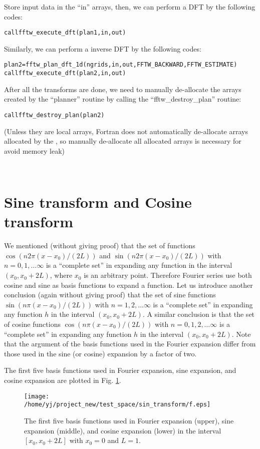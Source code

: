\documentclass{article}
\newcommand{\codestar}[1]{\text{{\bfseries{#1}}}}
\newenvironment{tmcode}[1][]{\begin{alltt} }{\end{alltt}}
\begin{document}
Store input data in the ``in'' arrays, then, we can perform a DFT by the
following codes:
\begin{tmcode}
call fftw_execute_dft(plan1, in, out)
\end{tmcode}
Similarly, we can perform a inverse DFT by the following codes:
\begin{tmcode}
plan2 = fftw_plan_dft_1d(ngrids, in,out,FFTW_BACKWARD,FFTW_ESTIMATE)
call fftw_execute_dft(plan2, in, out)
\end{tmcode}
After all the transforms are done, we need to manually de-allocate the arrays
created by the ``planner'' routine by calling the ``fftw\_destroy\_plan''
routine:
\begin{tmcode}
call fftw_destroy_plan(plan2)
\end{tmcode}
(Unless they are local arrays, Fortran does not automatically de-allocate
arrays allocated by the {\codestar{acllocate()}}, so manually de-allocate all
allocated arrays is necessary for avoid memory leak)

\

\section{Sine transform and Cosine transform}

We mentioned (without giving proof) that the set of functions $\cos (n 2 \pi
(x - x_0) / (2 L))$ and $\sin (n 2 \pi (x - x_0) / (2 L))$ with $n = 0, 1,
\ldots \infty$ is a ``complete set'' in expanding any function in the interval
$(x_0, x_0 + 2 L)$, where $x_0$ is an arbitrary point. Therefore Fourier
series use both cosine and sine as basis functions to expand a function. Let
us introduce another conclusion (again without giving proof) that the set of
sine functions $\sin (n \pi (x - x_0) / (2 L))$ with $n = 1, 2, \ldots \infty$
is a ``complete set'' in expanding any function $h$ in the interval $(x_0, x_0
+ 2 L)$. A similar conclusion is that the set of cosine functions $\cos (n \pi
(x - x_0) / (2 L))$ with $n = 0, 1, 2, \ldots \infty$ is a ``complete set'' in
expanding any function $h$ in the interval $(x_0, x_0 + 2 L)$. Note that the
argument of the basis functions used in the Fourier expansion differ from
those used in the sine (or cosine) expansion by a factor of two.

The first five basis functions used in Fourier expansion, sine expansion, and
cosine expansion are plotted in Fig. \ref{18-1-10-e1}.

\begin{figure}[h]
  \texttt{[image: /home/yj/project\_new/test\_space/sin\_transform/f.eps]}
  \caption{ \label{18-1-10-e1}The first five basis functions used in Fourier
  expansion (upper), sine expansion (middle), and cosine expansion (lower) in
  the interval $[x_0, x_0 + 2 L]$ with $x_0 = 0$ and $L = 1$.}
\end{figure}
\end{document}
